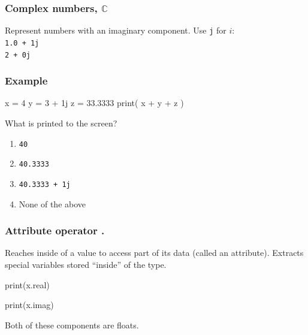 \documentclass[11pt]{beamer}
\begin{document}
\begin{frame}
  \frametitle{Complex numbers, $\mathbb{C}$}
  \Enlarge

  \begin{itemize}
  \myitem  Represent numbers with an imaginary component. \pause
  \myitem  Use \texttt{j} for $i$: \\
    \textcolor{CS101GradBot}{\texttt{1.0 + 1j}} \\
    \textcolor{CS101GradBot}{\texttt{2 + 0j}} 
  \end{itemize}
\end{frame}

\begin{frame}[fragile]
  \frametitle{Example}
  \Enlarge

  \begin{semiverbatim}
x = 4
y = 3 + 1j
z = 33.3333
print( x + y + z )
  \end{semiverbatim}
  What is printed to the screen?
  \begin{enumerate}[label=\Alph*]
  \item  \texttt{40}
  \item  \texttt{40.3333}
  \item  \texttt{40.3333 + 1j}
  \item  None of the above
  \end{enumerate}
\end{frame}

\begin{frame}
  \frametitle{Attribute operator \textbf{.}}
  \Enlarge

  \begin{itemize}
  \myitem  Reaches inside of a value to access part of its data (called an attribute). \pause
  \myitem  Extracts special variables stored ``inside'' of the type.
    \begin{semiverbatim}
print(x.real)

print(x.imag)
    \end{semiverbatim} \pause
  \myitem  Both of these components are floats.
  \end{itemize}
\end{frame}
\end{document}
